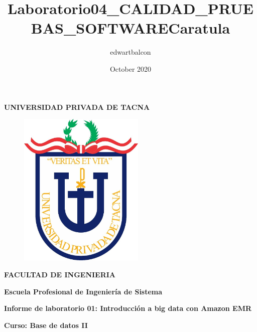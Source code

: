 \documentclass{article}
\title{Laboratorio04_CALIDAD_PRUEBAS_SOFTWARE}
\author{edwartbalcon }
\date{October 2020}
\begin{document}
\title{Caratula}

\begin{titlepage}
\begin{center}
\begin{Large}
\textbf{UNIVERSIDAD PRIVADA DE TACNA} \\
\end{Large}
\vspace*{-0.025in}
\begin{figure}[htb]
\begin{center}
\includegraphics[width=6cm]{./images/logo_UPT}
\end{center}
\end{figure}
\vspace*{-0.025in}
\begin{Large}
\textbf{FACULTAD DE INGENIERIA} \\
\end{Large}
\vspace*{0.05in}
\begin{Large}
\textbf{Escuela Profesional de Ingeniería de Sistema} \\
\end{Large}


\vspace*{0.4in}

\vspace*{0.1in}
\begin{Large}
\textbf{Informe de laboratorio 01: Introducción a big data con Amazon EMR} \\
\end{Large}

\vspace*{0.3in}
\begin{Large}
\textbf{Curso: Base de datos II} \\
\end{Large}


\end{center}
\end{titlepage}
\end{document}
